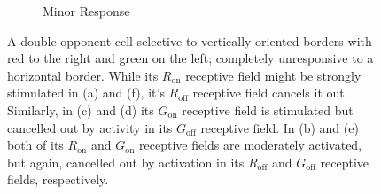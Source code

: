 \documentclass{article}
\begin{document}
\begin{figure}[h]
\begin{subfigure}{0.3\textwidth}
        \caption{Minor Response}
    \end{subfigure}
    \caption{A double-opponent cell selective to vertically oriented borders with red to the right and green on the left; completely unresponsive to a horizontal border. While its $R_{\text{on}}$ receptive field might be strongly stimulated in (a) and (f), it's $R_{\text{off}}$ receptive field cancels it out. Similarly, in (c) and (d) its $G_{\text{on}}$ receptive field is stimulated but cancelled out by activity in its $G_{\text{off}}$ receptive field. In (b) and (e) both of its $R_{\text{on}}$ and $G_{\text{on}}$ receptive fields are moderately activated, but again, cancelled out by activation in its $R_{\text{off}}$ and $G_{\text{off}}$ receptive fields, respectively.}
\end{figure}
\end{document}
